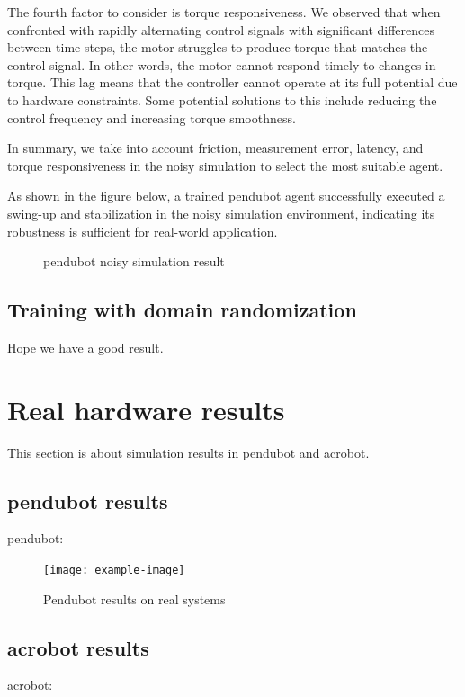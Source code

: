 The fourth factor to consider is torque responsiveness. We observed that when confronted with rapidly alternating control signals with significant differences between time steps, the motor struggles to produce torque that matches the control signal. In other words, the motor cannot respond timely to changes in torque. This lag means that the controller cannot operate at its full potential due to hardware constraints. Some potential solutions to this include reducing the control frequency and increasing torque smoothness.

In summary, we take into account friction, measurement error, latency, and torque responsiveness in the noisy simulation to select the most suitable agent.

As shown in the figure below, a trained pendubot agent successfully executed a swing-up and stabilization in the noisy simulation environment, indicating its robustness is sufficient for real-world application.

\begin{figure}[htbp]
    \centering
    \caption{pendubot noisy simulation result}
    \label{fig:image_b}
\end{figure}

\subsection{Training with domain randomization}
Hope we have a good result.


\section{Real hardware results}
This section is about simulation results in pendubot and acrobot.

\subsection{pendubot results}
pendubot:

\begin{figure}[H]
    \centering
    \texttt{[image: example-image]}
    \caption{Pendubot results on real systems}
    \label{fig:my_label}
\end{figure}

\subsection{acrobot results}
acrobot:

\cleardoublepage
